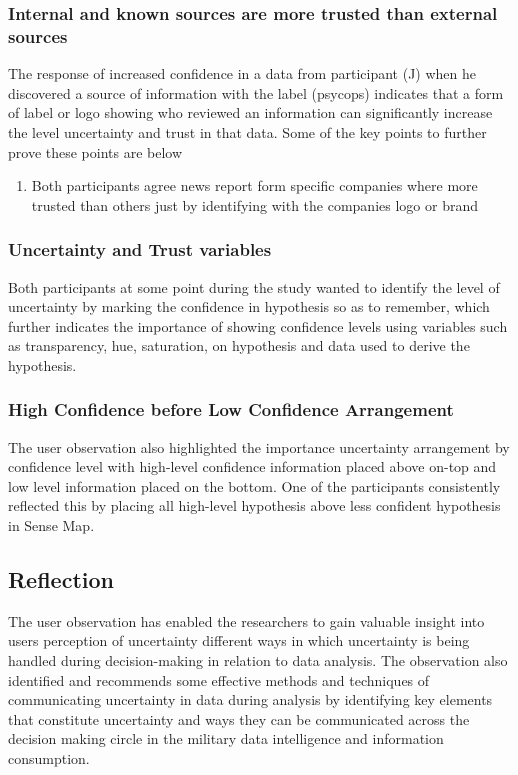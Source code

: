 \documentclass[journal]{vgtc}                %
\begin{document}
\subsubsection{Internal and known sources are more trusted than external sources}
The response of increased confidence in a data from participant (J) when he discovered a source of information with the label (psycops) indicates that a form of label or logo showing who reviewed an information can significantly increase the level uncertainty and trust in that data. Some of the key points to further prove these points are below
\begin{enumerate}
  \item Both participants agree news report form specific companies where more trusted than others just by identifying with the companies logo or brand
\end{enumerate}

\subsubsection{Uncertainty and Trust variables}
Both participants at some point during the study wanted to identify the level of uncertainty by marking the confidence in hypothesis so as to remember, which further indicates the importance of showing confidence levels using variables such as transparency, hue, saturation, on hypothesis and data used to derive the hypothesis. 

\subsubsection{High Confidence before Low Confidence Arrangement }
The user observation also highlighted the importance uncertainty arrangement by confidence level with high-level confidence information placed above on-top and low level information placed on the bottom. One of the participants consistently reflected this by placing all high-level hypothesis above less confident hypothesis in Sense Map. 

\subsection{Reflection}
The user observation has enabled the researchers to gain valuable insight into users perception of uncertainty different ways in which uncertainty is being handled during decision-making in relation to data analysis. The observation also identified and recommends some effective methods and techniques of communicating uncertainty in data during analysis by identifying key elements that constitute uncertainty and ways they can be communicated across the decision making circle in the military data intelligence and information consumption. 
\end{document}
